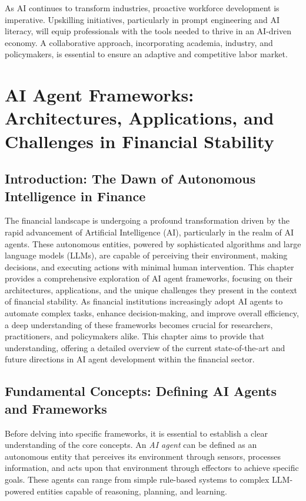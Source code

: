 \documentclass[a4paper,headinclude=on,footinclude=on,12pt,oneside]{scrbook}
\begin{document}

As AI continues to transform industries, proactive workforce development is imperative. Upskilling initiatives, particularly in prompt engineering and AI literacy, will equip professionals with the tools needed to thrive in an AI-driven economy. A collaborative approach, incorporating academia, industry, and policymakers, is essential to ensure an adaptive and competitive labor market.
%

\chapter{AI Agent Frameworks: Architectures, Applications, and Challenges in Financial Stability}

\section*{Introduction: The Dawn of Autonomous Intelligence in Finance}

The financial landscape is undergoing a profound transformation driven by the rapid advancement of Artificial Intelligence (AI), particularly in the realm of AI agents. These autonomous entities, powered by sophisticated algorithms and large language models (LLMs), are capable of perceiving their environment, making decisions, and executing actions with minimal human intervention. This chapter provides a comprehensive exploration of AI agent frameworks, focusing on their architectures, applications, and the unique challenges they present in the context of financial stability. As financial institutions increasingly adopt AI agents to automate complex tasks, enhance decision-making, and improve overall efficiency, a deep understanding of these frameworks becomes crucial for researchers, practitioners, and policymakers alike. This chapter aims to provide that understanding, offering a detailed overview of the current state-of-the-art and future directions in AI agent development within the financial sector.

\section*{Fundamental Concepts: Defining AI Agents and Frameworks}

Before delving into specific frameworks, it is essential to establish a clear understanding of the core concepts. An \textit{AI agent} can be defined as an autonomous entity that perceives its environment through sensors, processes information, and acts upon that environment through effectors to achieve specific goals. These agents can range from simple rule-based systems to complex LLM-powered entities capable of reasoning, planning, and learning.
\end{document}
